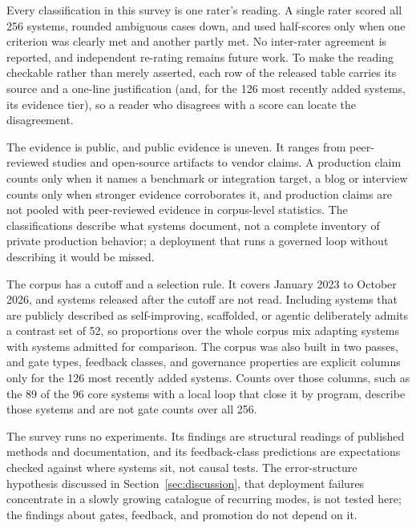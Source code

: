 Every classification in this survey is one rater's reading. A single rater scored all 256 systems, rounded ambiguous cases down, and used half-scores only when one criterion was clearly met and another partly met. No inter-rater agreement is reported, and independent re-rating remains future work. To make the reading checkable rather than merely asserted, each row of the released table carries its source and a one-line justification (and, for the 126 most recently added systems, its evidence tier), so a reader who disagrees with a score can locate the disagreement.

The evidence is public, and public evidence is uneven. It ranges from peer-reviewed studies and open-source artifacts to vendor claims. A production claim counts only when it names a benchmark or integration target, a blog or interview counts only when stronger evidence corroborates it, and production claims are not pooled with peer-reviewed evidence in corpus-level statistics. The classifications describe what systems document, not a complete inventory of private production behavior; a deployment that runs a governed loop without describing it would be missed.

The corpus has a cutoff and a selection rule. It covers January 2023 to October 2026, and systems released after the cutoff are not read. Including systems that are publicly described as self-improving, scaffolded, or agentic deliberately admits a contrast set of 52, so proportions over the whole corpus mix adapting systems with systems admitted for comparison. The corpus was also built in two passes, and gate types, feedback classes, and governance properties are explicit columns only for the 126 most recently added systems. Counts over those columns, such as the 89 of the 96 core systems with a local loop that close it by program, describe those systems and are not gate counts over all 256.

The survey runs no experiments. Its findings are structural readings of published methods and documentation, and its feedback-class predictions are expectations checked against where systems sit, not causal tests. The error-structure hypothesis discussed in Section~\ref{sec:discussion}, that deployment failures concentrate in a slowly growing catalogue of recurring modes, is not tested here; the findings about gates, feedback, and promotion do not depend on it.
